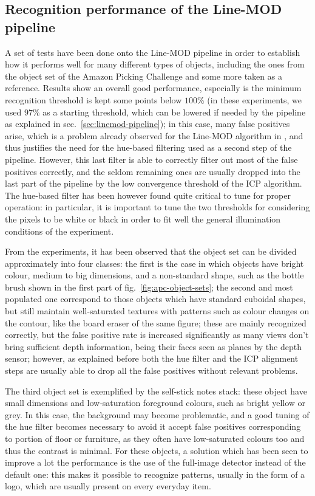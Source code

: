 \subsection{Recognition performance of the Line-MOD pipeline}
A set of tests have been done onto the Line-MOD pipeline in order to
establish how it performs well for many different types of objects,
including the ones from the object set of the Amazon Picking Challenge
and some more taken as a reference. Results show an overall good
performance, especially is the minimum recognition threshold is kept
some points below $100\%$ (in these experiments, we used $97\%$ as a
starting threshold, which can be lowered if needed by the pipeline as
explained in sec.~\ref{sec:linemod-pipeline}); in this case, many
false positives arise, which is a problem already observed for the
Line-MOD algorithm in \cite{linemod-pipeline}, and thus justifies the
need for the hue-based filtering used as a second step of the
pipeline. However, this last filter is able to correctly filter out
most of the false positives correctly, and the seldom remaining ones
are usually dropped into the last part of the pipeline by the low
convergence threshold of the ICP algorithm. The hue-based filter
has been however found quite critical to tune for proper operation: in
particular, it is important to tune the two thresholds for considering
the pixels to be white or black in order to fit well the general
illumination conditions of the experiment.

From the experiments, it has been observed that the object set can be
divided approximately into four classes: the first is the case in which
objects have bright colour, medium to big dimensions, and a
non-standard shape, such as the bottle brush shown in the first part
of fig.~\ref{fig:apc-object-sets}; the second and most populated one correspond to those
objects which have standard cuboidal shapes, but still maintain
well-saturated textures with patterns such as colour changes on the
contour, like the board eraser of the same figure; these are mainly
recognized correctly, but the false positive rate is increased
significantly as many views don't bring sufficient depth information,
being their faces seen as planes by the depth sensor; however, as
explained before both the hue filter and the ICP alignment steps are
usually able to drop all the false positives without relevant
problems.

The third object set is exemplified by the self-stick notes stack:
these object have small dimensions and low-saturation foreground
colours, such as bright yellow or grey. In this case, the background
may become problematic, and a good tuning of the hue filter becomes
necessary to avoid it accept false positives corresponding to portion
of floor or furniture, as they often have low-saturated colours too
and thus the contrast is minimal. For these objects, a solution which
has been seen to improve a lot the performance is the use of the
full-image detector instead of the default one: this makes it possible
to recognize patterns, usually in the form of a logo, which are
usually present on every everyday item.

